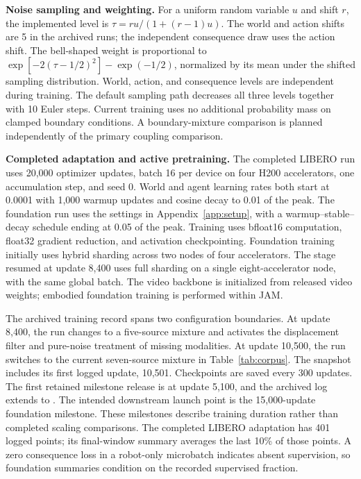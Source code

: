 \textbf{Noise sampling and weighting.}
For a uniform random variable $u$ and shift $r$, the implemented level is $\tau=ru/(1+(r-1)u)$. The
world and action shifts are 5 in the archived runs; the independent consequence draw uses the action
shift. The bell-shaped weight is proportional to $\exp[-2(\tau-1/2)^2]-\exp(-1/2)$, normalized by
its mean under the shifted sampling distribution. World, action, and consequence levels are
independent during training. The default sampling path decreases all three levels together with 10
Euler steps. Current training uses no additional probability mass on clamped boundary conditions. A
boundary-mixture comparison is planned independently of the primary coupling comparison.

\textbf{Completed adaptation and active pretraining.}
The completed LIBERO run uses 20,000 optimizer updates, batch 16 per device on four H200
accelerators, one accumulation step, and seed 0. World and agent learning rates both start at 0.0001
with 1,000 warmup updates and cosine decay to 0.01 of the peak. The foundation run uses the settings
in Appendix~\ref{app:setup}, with a warmup--stable--decay schedule ending at 0.05 of the peak.
Training uses bfloat16 computation, float32 gradient reduction, and activation checkpointing.
Foundation training initially uses hybrid sharding across two nodes of four accelerators.
The stage resumed at update 8,400 uses full sharding on a single eight-accelerator node,
with the same global batch. The video backbone
is initialized from released video weights; embodied foundation training is performed within JAM.

The archived training record spans two configuration boundaries. At update 8,400, the run changes
to a five-source mixture and activates the displacement filter and pure-noise treatment of missing
modalities. At update 10,500, the run switches to the current seven-source mixture in
Table~\ref{tab:corpus}. The snapshot includes its first logged update, 10,501.
Checkpoints are saved every 300 updates. The first retained milestone release is at update 5,100,
and the archived log extends to \FoundationSteps{}. The intended downstream launch point is the
15,000-update foundation milestone. These milestones describe training duration rather than
completed scaling comparisons. The completed LIBERO adaptation has 401 logged points; its
final-window summary averages the last 10\% of those points. A zero consequence loss in a robot-only
microbatch indicates absent supervision, so foundation summaries condition on the recorded
supervised fraction.



